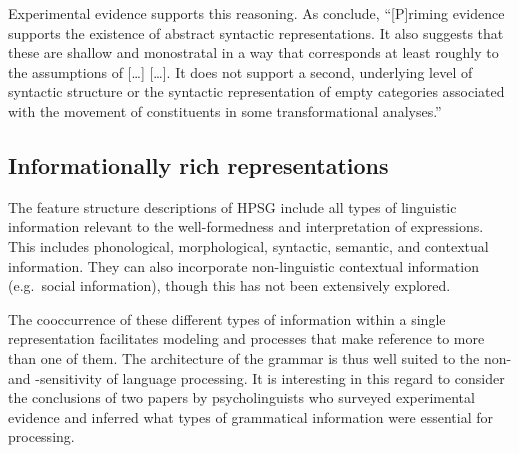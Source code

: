 \documentclass[output=paper,biblatex,babelshorthands,newtxmath,draftmode,colorlinks,citecolor=brown]{langscibook}
\begin{document}
Experimental evidence supports this reasoning.  As \citet[]{BraniganPickering2017} conclude,
``[P]riming evidence supports the existence of abstract syntactic representations. It also suggests
that these are shallow and monostratal in a way that corresponds at least roughly to the assumptions
of [\ldots{}] \citet{ps2} [\ldots{}]. It does not support a second, underlying level of syntactic
structure or the syntactic representation of empty categories associated with the movement of
constituents in some transformational analyses.''

\subsection{Informationally rich representations}

The feature structure descriptions of HPSG include all types of linguistic information relevant to the well-formedness and interpretation of expressions. This includes phonological, morphological, syntactic, semantic, and contextual information.  They can also incorporate non-linguistic contextual information (e.g.\ social information), though this has not been extensively explored.

The cooccurrence of these different types of information within a single
representation facilitates modeling  and  processes that make
reference to more than one of them.  The architecture of the grammar is thus well suited to the
non- and -sensitivity of language processing.  It is interesting in
this regard to consider the conclusions of two papers by psycholinguists who surveyed experimental
evidence and inferred what types of grammatical information were essential for processing.
\end{document}
